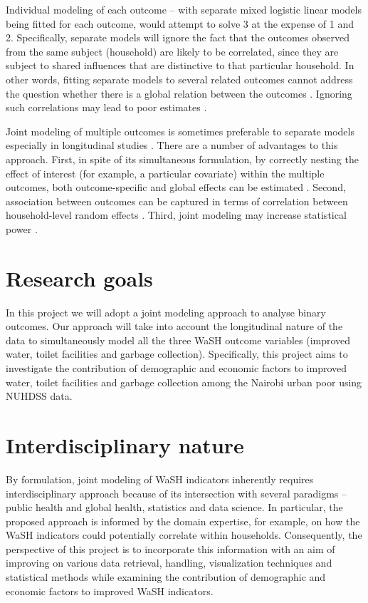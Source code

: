 Individual modeling of each outcome -- with separate mixed logistic linear models being fitted for each outcome, would attempt to solve 3 at the expense of 1 and 2. Specifically, separate models will ignore the fact that the outcomes observed from the same subject (household) are likely to be correlated, since they are subject to shared influences that are distinctive to that particular household. In other words, fitting separate models to several related outcomes cannot address the question whether there is a global relation between the outcomes \citep{lalonde2019disc}. Ignoring such correlations may lead to poor estimates \citep{dassimultaneous, fang2018joint, ivanova2016mixed, miro2004bayesian, lalonde2019disc}.

Joint modeling of multiple outcomes is sometimes preferable to separate models especially in longitudinal studies \citep{dassimultaneous,fang2018joint,lalonde2019disc}. There are a number of advantages to this approach. First, in spite of its simultaneous formulation, by correctly nesting the effect of interest (for example, a particular covariate) within the multiple outcomes, both outcome-specific and global effects can be estimated \citep{dassimultaneous,lalonde2019disc}. Second, association between outcomes can be captured in terms of correlation between household-level random effects \citep{ivanova2016mixed}. Third, joint modeling may increase statistical power \citep{dassimultaneous}.

\section{Research goals}

In this project we will adopt a joint modeling approach to analyse binary outcomes. Our approach will take into account the longitudinal nature of the data to simultaneously model all the three WaSH outcome variables (improved water, toilet facilities and garbage collection). Specifically, this project aims to investigate the contribution of demographic and economic factors to improved water, toilet facilities and garbage collection among the Nairobi urban poor using NUHDSS data.

\section{Interdisciplinary nature}

By formulation, joint modeling of WaSH indicators inherently requires interdisciplinary approach because of its intersection with several paradigms -- public health and global health, statistics and data science. In particular, the proposed approach is informed by the domain expertise, for example, on how the WaSH indicators could potentially correlate within households. Consequently, the perspective of this project is to incorporate this information with an aim of improving on various data retrieval, handling, visualization techniques and statistical methods while examining the contribution of demographic and economic factors to improved WaSH indicators.

